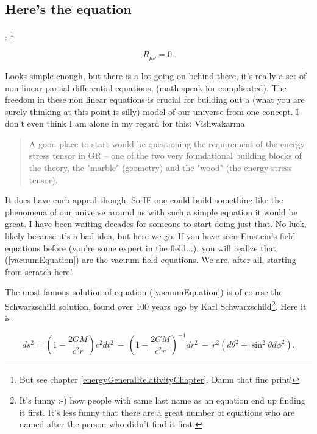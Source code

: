 \documentclass[../rzero]{subfiles}
\begin{document}
\subsection{Here's the equation}
: \footnote{But see chapter \ref{energyGeneralRelativityChapter}. Damn that fine print!} 
	

\begin{equation}\label{vacuumEquation} 
	 R_{\mu\nu} = 0 .  
\end{equation}

Looks simple enough, but there is a lot going on behind there, it's really a set of non linear partial differential equations, (math speak for complicated). The freedom in these non linear equations is crucial for building out a (what you are surely thinking at this point is silly) model of our universe from one concept. I don't even think I am alone in my regard for this: Vishwakarma\cite{vishwakarmaEinsteinCriticalPerspective2016}\cite{vishwakarmaMysteriesRikNovel2014}
\begin{quotation}
	A good place to start would be questioning the requirement of the energy-stress tensor in GR – one of the two very foundational building blocks of the theory, the "marble" (geometry) and the "wood" (the energy-stress tensor).
	\end{quotation}

It does have curb appeal though. So IF one could build something like the phenomena of our universe around us with such a simple equation it would be great. I have been waiting decades for someone to start doing just that. No luck, likely because it's a bad idea, but here we go. If you have seen Einstein's field equations before (you're some expert in the field$\ldots$), you will realize that (\ref{vacuumEquation}) are the vacuum field equations. We are, after all, starting from scratch here!

The most famous solution of equation (\ref{vacuumEquation}) is of course the Schwarzschild solution, found over 100 years ago by Karl Schwarzschild\footnote{It's funny :-) how people with same last name as an equation end up finding it first. It's less funny that there are a great number of equations who are named after the person who didn't find it first.}\cite{schwarzschildGravitationalFieldMass1999}. Here it is:

\begin{equation}
	d s^2=\left(1-\frac{2 G M}{c^2 r}\right) c^2 d t^2\ -\ \left(1-\frac{2 G M}{c^2 r}\right)^{-1} d r^2\ -\ r^2\left(d \theta^2+\sin ^2 \theta d \phi^2\right) .
\end{equation}
\end{document}

